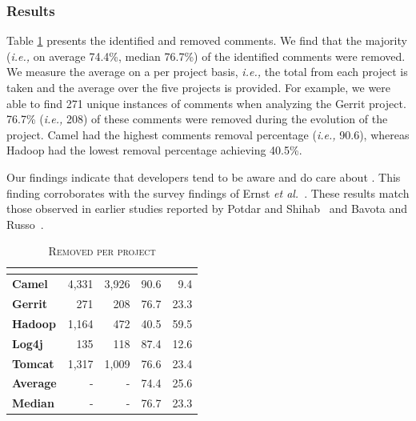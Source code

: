 

\subsubsection*{Results} Table \ref{tbl:removed_self_admitted_technical_debt_per_project} presents the identified and removed \SATD comments. We find that the majority (\textit{i.e.,} on average 74.4\%, median 76.7\%) of the identified \SATD comments were removed. We measure the average on a per project basis, \textit{i.e.,} the total from each project is taken and the average over the five projects is provided. For example, we were able to find 271 unique instances of \SATD comments when analyzing the Gerrit project. 76.7\% (\textit{i.e.,} 208) of these \SATD comments were removed during the evolution of the project. Camel had the highest \SATD comments removal percentage (\textit{i.e.,} 90.6), whereas Hadoop had the lowest removal percentage achieving 40.5\%. 

Our findings indicate that developers tend to be aware and do care about \SATD. This finding corroborates with the survey findings of Ernst \emph{et al.}~\cite{Ernst2015FSE}. These results match those observed in earlier studies reported by Potdar and Shihab~\cite{Potdar2014ICSME} and Bavota and Russo~\cite{Bavota2016MSR}.

\begin{table}[!t]
	\begin{center}
		\caption{\textsc{Removed \SATD per project}}
		\label{tbl:removed_self_admitted_technical_debt_per_project}
		\begin{tabular}{l|rrrr}
			\toprule
			\textbf{\thead{Project}} & \textbf{\thead{\#identified}} & \textbf{\thead{\#removed}} & \textbf{\thead{\% removed}} &  \textbf{\thead{\% remains}}  \\ 
			\midrule
			\textbf{Camel }  &  4,331  & 3,926  & 90.6  & 9.4\\
			\textbf{Gerrit}  &  271    & 208    & 76.7 & 23.3 \\
			\textbf{Hadoop}  &  1,164  & 472    & 40.5 & 59.5 \\  
			\textbf{Log4j }  &  135    & 118    & 87.4 & 12.6\\ 
			\textbf{Tomcat}  &  1,317  & 1,009  & 76.6 & 23.4\\   
			\midrule
			\textbf{Average} & -       & -      & 74.4 & 25.6\\
			\textbf{Median} & -       & -      & 76.7 & 23.3\\
			\bottomrule
		\end{tabular}
	\end{center}    
\end{table}

